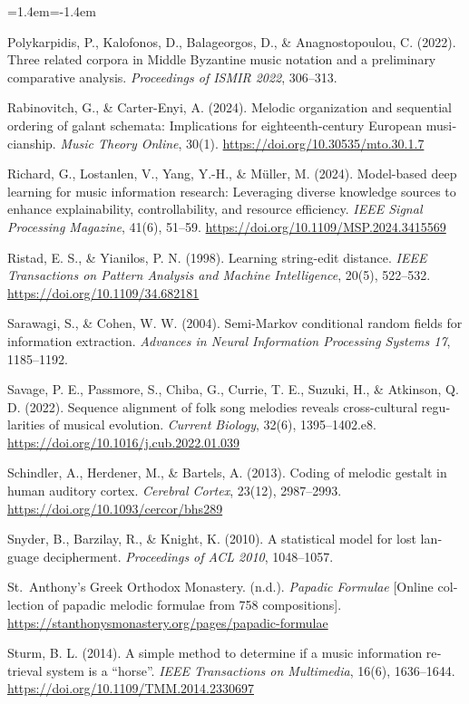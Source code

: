 \documentclass[11pt,a4paper]{article}
\newenvironment{reflist}{\begin{list}{}{\leftmargin=1.4em\itemindent=-1.4em\itemsep=0.8pt\parsep=0pt}\small}{\end{list}}
\begin{document}
\begin{otherlanguage}{english}
\begin{reflist}
\item Polykarpidis, P., Kalofonos, D., Balageorgos, D., \& Anagnostopoulou, C. (2022). Three related corpora in Middle Byzantine music notation and a preliminary comparative analysis. \emph{Proceedings of ISMIR 2022}, 306--313.
\item Rabinovitch, G., \& Carter-Enyi, A. (2024). Melodic organization and sequential ordering of galant schemata: Implications for eighteenth-century European musicianship. \emph{Music Theory Online}, 30(1). \url{https://doi.org/10.30535/mto.30.1.7}
\item Richard, G., Lostanlen, V., Yang, Y.-H., \& Müller, M. (2024). Model-based deep learning for music information research: Leveraging diverse knowledge sources to enhance explainability, controllability, and resource efficiency. \emph{IEEE Signal Processing Magazine}, 41(6), 51--59. \url{https://doi.org/10.1109/MSP.2024.3415569}
\item Ristad, E. S., \& Yianilos, P. N. (1998). Learning string-edit distance. \emph{IEEE Transactions on Pattern Analysis and Machine Intelligence}, 20(5), 522--532. \url{https://doi.org/10.1109/34.682181}
\item Sarawagi, S., \& Cohen, W. W. (2004). Semi-Markov conditional random fields for information extraction. \emph{Advances in Neural Information Processing Systems 17}, 1185--1192.
\item Savage, P. E., Passmore, S., Chiba, G., Currie, T. E., Suzuki, H., \& Atkinson, Q. D. (2022). Sequence alignment of folk song melodies reveals cross-cultural regularities of musical evolution. \emph{Current Biology}, 32(6), 1395--1402.e8. \url{https://doi.org/10.1016/j.cub.2022.01.039}
\item Schindler, A., Herdener, M., \& Bartels, A. (2013). Coding of melodic gestalt in human auditory cortex. \emph{Cerebral Cortex}, 23(12), 2987--2993. \url{https://doi.org/10.1093/cercor/bhs289}
\item Snyder, B., Barzilay, R., \& Knight, K. (2010). A statistical model for lost language decipherment. \emph{Proceedings of ACL 2010}, 1048--1057.
\item St.~Anthony's Greek Orthodox Monastery. (n.d.). \emph{Papadic Formulae} [Online collection of papadic melodic formulae from 758 compositions]. \url{https://stanthonysmonastery.org/pages/papadic-formulae}
\item Sturm, B. L. (2014). A simple method to determine if a music information retrieval system is a ``horse''. \emph{IEEE Transactions on Multimedia}, 16(6), 1636--1644. \url{https://doi.org/10.1109/TMM.2014.2330697}

\end{reflist}
\end{otherlanguage}
\end{document}
